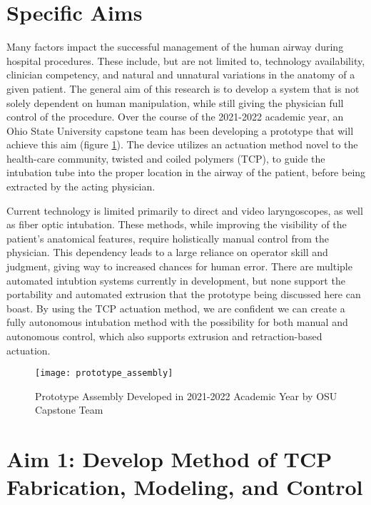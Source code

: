\section*{Specific Aims}
\label{parts:specific_aims}

Many factors impact the successful management of the human airway during hospital procedures. These include, but are not limited to, technology availability, clinician competency, and natural and unnatural variations in the anatomy of a given patient. The general aim of this research is to develop a system that is not solely dependent on human manipulation, while still giving the physician full control of the procedure. Over the course of the 2021-2022 academic year, an Ohio State University capstone team has been developing a prototype that will achieve this aim (figure \ref{fig:prototype_assembly}). The device utilizes an actuation method novel to the health-care community, twisted and coiled polymers (TCP), to guide the intubation tube into the proper location in the airway of the patient, before being extracted by the acting physician.

Current technology is limited primarily to direct and video laryngoscopes, as well as fiber optic intubation. These methods, while improving the visibility of the patient's anatomical features, require holistically manual control from the physician. This dependency leads to a large reliance on operator skill and judgment, giving way to increased chances for human error. There are multiple automated intubtion systems currently in development, but none support the portability and automated extrusion that the prototype being discussed here can boast. By using the TCP actuation method, we are confident we can create a fully autonomous intubation method with the possibility for both manual and autonomous control, which also supports extrusion and retraction-based actuation.

\begin{figure}[ht]
	\centering
	\texttt{[image: prototype\_assembly]}
	\caption{Prototype Assembly Developed in 2021-2022 Academic Year by OSU Capstone Team}
	\label{fig:prototype_assembly}
\end{figure}

	\section{Aim 1: Develop Method of TCP Fabrication, Modeling, and Control}
	\label{subsect:aim1}
	
